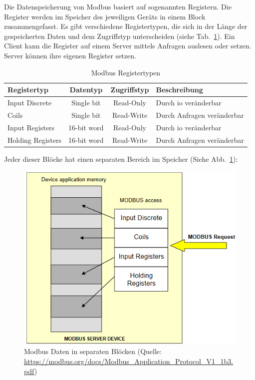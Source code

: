 Die Datenspeicherung von Modbus basiert auf sogenannten Registern. Die Register werden im Speicher des jeweiligen Geräts in einem Block zusammengefasst. Es gibt verschiedene Registertypen, die sich in der Länge der gespeicherten Daten und dem Zugriffstyp unterscheiden (siehe Tab.~\ref{tab:modbus_register}). \newline Ein Client kann die Register auf einem Server mittels Anfragen auslesen oder setzen. Server können ihre eigenen Register setzen.
\begin{table}[H]
	\caption{Modbus Registertypen \label{tab:modbus_register}}
	\begin{tabularx}{\textwidth}{@{}l|c|c|X@{}}
		\toprule
		\textbf{Registertyp} & \textbf{Datentyp} & \textbf{Zugriffstyp} & \textbf{Beschreibung} \\
		\midrule
		Input Discrete & Single bit & Read-Only & Durch \acf{io} veränderbar \\
		Coils & Single bit & Read-Write & Durch Anfragen veränderbar \\
		Input Registers & 16-bit word & Read-Only & Durch \acs{io} veränderbar \\
		Holding Registers & 16-bit word & Read-Write & Durch Anfragen veränderbar \\
		\bottomrule
	\end{tabularx}
\end{table} 
\cite{IPC2U_GmbH:o.J.}

Jeder dieser Blöcke hat einen separaten Bereich im Speicher (Siehe Abb.~\ref{fig:modbus_register_many_blocks}):
\begin{figure}[H]
	\centering
	\includegraphics[width=0.4\linewidth]{Bilder/Modbus_Data_Model_with_separate_block}
	\caption{Modbus Daten in separaten Blöcken (Quelle: \url{https://modbus.org/docs/Modbus_Application_Protocol_V1_1b3.pdf})}
	\label{fig:modbus_register_many_blocks}
\end{figure}

